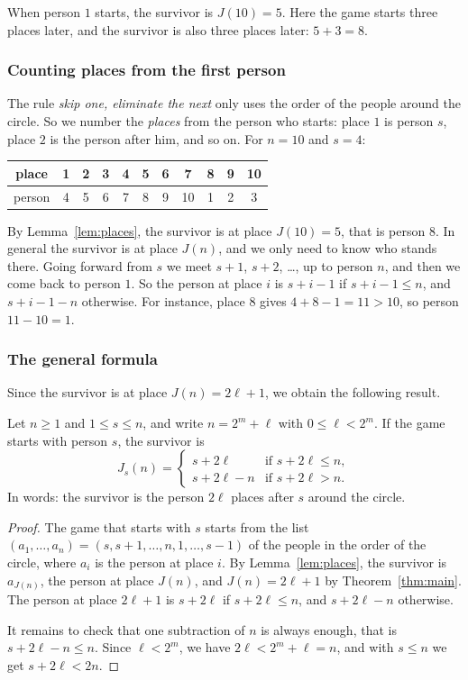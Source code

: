 When person $1$ starts, the survivor is $J(10)=5$. Here the game starts three
places later, and the survivor is also three places later: $5+3=8$.

\subsubsection{Counting places from the first person}

The rule \emph{skip one, eliminate the next} only uses the order of the people
around the circle. So we number the \emph{places} from the person who starts:
place $1$ is person $s$, place $2$ is the person after him, and so on. For
$n=10$ and $s=4$:
\begin{center}
\renewcommand{\arraystretch}{1.2}
\begin{tabular}{|c|c|c|c|c|c|c|c|c|c|c|}
\hline
place & 1&2&3&4&5&6&7&8&9&10\\ \hline
person & 4&5&6&7&8&9&10&1&2&3\\ \hline
\end{tabular}
\end{center}
By Lemma~\ref{lem:places}, the survivor is at place $J(10)=5$, that is
person $8$. In general the survivor is at place $J(n)$, and we only need to
know who stands there. Going forward from $s$ we meet $s+1$, $s+2$, \dots, up
to person $n$, and then we come back to person $1$. So the person at place $i$
is $s+i-1$ if $s+i-1\leq n$, and $s+i-1-n$ otherwise. For instance, place $8$
gives $4+8-1=11>10$, so person $11-10=1$.

\subsubsection{The general formula}

Since the survivor is at place $J(n)=2\ell+1$, we obtain the following
result.

\begin{theo}\label{thm:general}
Let $n\geq1$ and $1\leq s\leq n$, and write $n=2^m+\ell$ with $0\leq\ell<2^m$.
If the game starts with person $s$, the survivor is
\[
J_s(n)=
\begin{cases}
s+2\ell & \text{if } s+2\ell\leq n,\\
s+2\ell-n & \text{if } s+2\ell>n.
\end{cases}
\]
In words: the survivor is the person $2\ell$ places after $s$ around the
circle.
\end{theo}

\begin{proof}
The game that starts with $s$ starts from the list
$(a_1,\dots,a_n)=(s,s+1,\dots,n,1,\dots,s-1)$ of the people in the order of
the circle, where $a_i$ is the person at place $i$. By
Lemma~\ref{lem:places}, the survivor is $a_{J(n)}$, the person at place
$J(n)$, and $J(n)=2\ell+1$ by Theorem~\ref{thm:main}. The person at
place $2\ell+1$ is $s+2\ell$ if $s+2\ell\leq n$, and $s+2\ell-n$ otherwise.

It remains to check that one subtraction of $n$ is always enough, that is
$s+2\ell-n\leq n$. Since $\ell<2^m$, we have $2\ell<2^m+\ell=n$, and with
$s\leq n$ we get $s+2\ell<2n$.
\end{proof}

